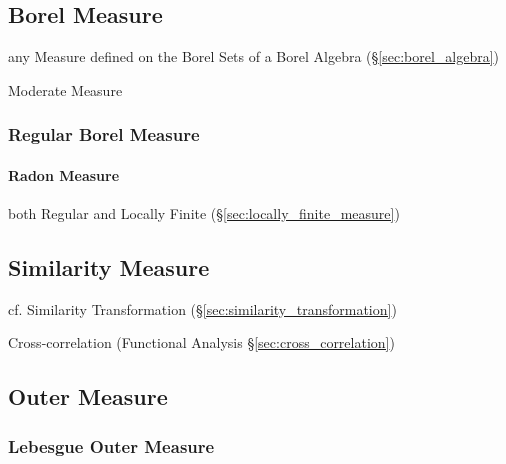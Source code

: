 \subsection{Borel Measure}\label{sec:borel_measure}

any Measure defined on the Borel Sets of a Borel Algebra
(\S\ref{sec:borel_algebra})

Moderate Measure



\subsubsection{Regular Borel Measure}\label{sec:regualr_borel}\hfill

\paragraph{Radon Measure}\label{sec:radon_measure}\hfill

both Regular and Locally Finite (\S\ref{sec:locally_finite_measure})



\subsection{Similarity Measure}\label{sec:similarity_measure}

\fist cf. Similarity Transformation (\S\ref{sec:similarity_transformation})

Cross-correlation (Functional Analysis \S\ref{sec:cross_correlation})



\subsection{Outer Measure}\label{sec:outer_measure}

\subsubsection{Lebesgue Outer Measure}\label{sec:lebesgue_outer_measure}

